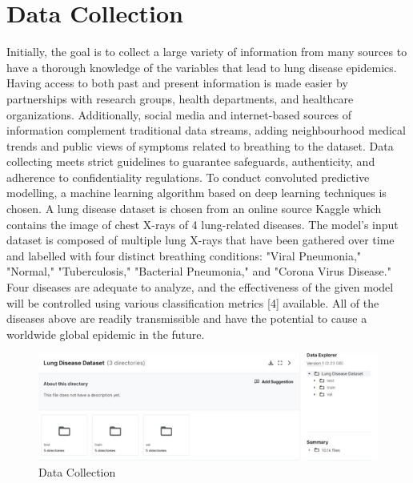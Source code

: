 \section{Data Collection}
Initially, the goal is to collect a large variety of information from many sources to have a thorough knowledge of the variables that lead to lung disease epidemics. Having access to both past and present information is made easier by partnerships with research groups, health departments, and healthcare organizations. Additionally, social media and internet-based sources of information complement traditional data streams, adding neighbourhood medical trends and public views of symptoms related to breathing to the dataset. Data collecting meets strict guidelines to guarantee safeguards, authenticity, and adherence to confidentiality regulations. To conduct convoluted predictive modelling, a machine learning algorithm based on deep learning techniques is chosen. A lung disease dataset is chosen from an online source Kaggle which contains the image of chest X-rays of 4 lung-related diseases. The model's input dataset is composed of multiple lung X-rays that have been gathered over time and labelled with four distinct breathing conditions: "Viral Pneumonia," "Normal," "Tuberculosis," "Bacterial Pneumonia," and "Corona Virus Disease." Four diseases are adequate to analyze, and the effectiveness of the given model will be controlled using various classification metrics [4] available. All of the diseases above are readily transmissible and have the potential to cause a worldwide global epidemic in the future. 

\begin{figure}[ht]
    \centering
    \includegraphics[scale=0.9]{figures/Picture99.jpg}
    \caption{Data Collection}
    \label{fig:chart_a}
\end{figure}

